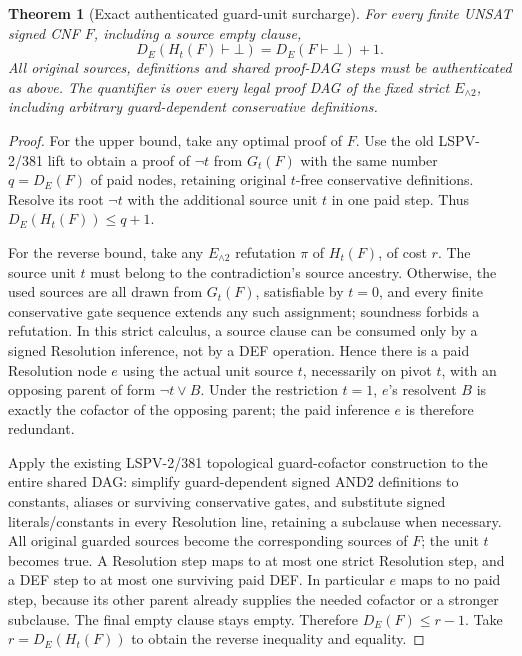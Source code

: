 \documentclass[11pt]{article}
\newtheorem{theorem}{Theorem}
\begin{document}
\begin{theorem}[Exact authenticated guard-unit surcharge]\label{thm:one}
For every finite UNSAT signed CNF \(F\), including a source empty clause,
\[
\boxed{D_E(H_t(F)\vdash\bot)=D_E(F\vdash\bot)+1.}
\]
All original sources, definitions and shared proof-DAG steps must be authenticated as above. The quantifier is over \emph{every} legal proof DAG of the fixed strict \(E_{\land2}\), including arbitrary guard-dependent conservative definitions.
\end{theorem}
\begin{proof}
For the upper bound, take any optimal proof of \(F\). Use the old LSPV-2/381 lift to obtain a proof of \(\neg t\) from \(G_t(F)\) with the same number \(q=D_E(F)\) of paid nodes, retaining original \(t\)-free conservative definitions. Resolve its root \(\neg t\) with the additional source unit \(t\) in one paid step. Thus \(D_E(H_t(F))\le q+1\).

For the reverse bound, take any \(E_{\land2}\) refutation \(\pi\) of \(H_t(F)\), of cost \(r\). The source unit \(t\) must belong to the contradiction's source ancestry. Otherwise, the used sources are all drawn from \(G_t(F)\), satisfiable by \(t=0\), and every finite conservative gate sequence extends any such assignment; soundness forbids a refutation. In this strict calculus, a source clause can be consumed only by a signed Resolution inference, not by a DEF operation. Hence there is a paid Resolution node \(e\) using the actual unit source \(t\), necessarily on pivot \(t\), with an opposing parent of form \(\neg t\vee B\). Under the restriction \(t=1\), \(e\)'s resolvent \(B\) is exactly the cofactor of the opposing parent; the paid inference \(e\) is therefore redundant.

Apply the existing LSPV-2/381 topological guard-cofactor construction to the entire shared DAG: simplify guard-dependent signed AND2 definitions to constants, aliases or surviving conservative gates, and substitute signed literals/constants in every Resolution line, retaining a subclause when necessary. All original guarded sources become the corresponding sources of \(F\); the unit \(t\) becomes true. A Resolution step maps to at most one strict Resolution step, and a DEF step to at most one surviving paid DEF. In particular \(e\) maps to no paid step, because its other parent already supplies the needed cofactor or a stronger subclause. The final empty clause stays empty. Therefore \(D_E(F)\le r-1\). Take \(r=D_E(H_t(F))\) to obtain the reverse inequality and equality.
\end{proof}
\end{document}
